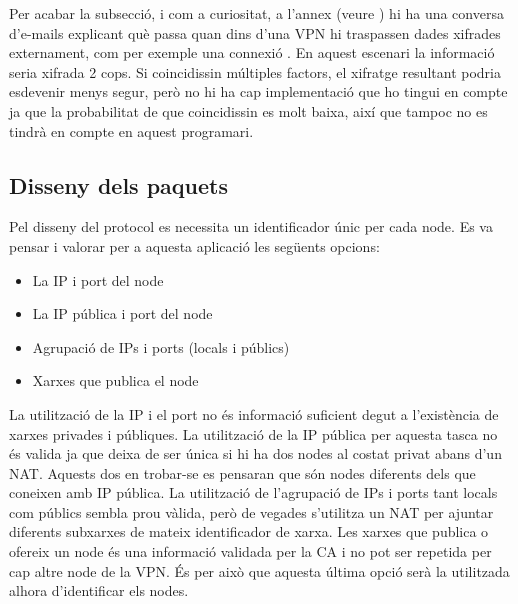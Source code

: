 Per acabar la subsecció, i com a curiositat, a l'annex  (veure \cite{deq-metzdowd}) hi ha una conversa d'e-mails explicant què passa quan dins d'una VPN hi traspassen dades xifrades externament, com per exemple una connexió . En aquest escenari la informació seria xifrada 2 cops. Si coincidissin múltiples factors, el xifratge resultant podria esdevenir menys segur, però no hi ha cap implementació que ho tingui en compte ja que la probabilitat de que coincidissin es molt baixa, així que tampoc no es tindrà en compte en aquest programari.

\subsection{Disseny dels paquets}
Pel disseny del protocol es necessita un identificador únic per cada node. Es va pensar i valorar per a aquesta aplicació les següents opcions:
\begin{itemize}
\item La IP i port del node
\item La IP pública i port del node
\item Agrupació de IPs i ports (locals i públics)
\item Xarxes que publica el node
\end{itemize}
La utilització de la IP i el port no és informació suficient degut a l'existència de xarxes privades i públiques. %
La utilització de la IP pública per aquesta tasca no és valida ja que deixa de ser única si hi ha dos nodes al costat privat abans d'un NAT. Aquests dos en trobar-se es pensaran que són nodes diferents dels que coneixen amb IP pública.
La utilització de l'agrupació de IPs i ports tant locals com públics sembla prou vàlida, però de vegades s'utilitza un NAT per ajuntar diferents subxarxes de mateix identificador de xarxa.
Les xarxes que publica o ofereix un node és una informació validada per la CA i no pot ser repetida per cap altre node de la VPN. És per això que aquesta última opció serà la utilitzada alhora d'identificar els nodes.

